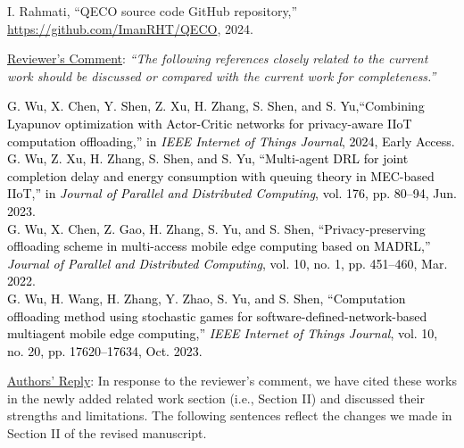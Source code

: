 \documentclass[12pt,draftclsnofoot,onecolumn]{IEEEtran}
\newcommand{\rev}[1]{{\color{blue}#1}} %
\newcommand{\rev}[1]{#1}
\newenvironment{my}[2]%
{\begin{list}{}%
{\setlength{\rightmargin}{#1}\setlength{\leftmargin}{#2}}%


 \item[]{}

} {\end{list}}
\begin{document}
\begin{enumerate}
		\begin{my}{1cm}{1cm}
	\rev{
		{\small
			\noindent\hspace{-0.5mm}\cite{QECO} I. Rahmati, ``QECO source code GitHub repository,'' \url{https://github.com/ImanRHT/QECO}, 2024.\\[6pt]}}
\end{my}



	\item \underline{Reviewer's Comment}: 
	\textit{``The following references closely related to the current work should be discussed or compared with the current work for completeness.''} \newline
		\begin{my}{1cm}{1cm}
		\rev{ 
			{\small
				\noindent\hspace{-1.8mm}
				\cite{wu2024combining}  \textcolor{black}{G. Wu, X. Chen, Y. Shen, Z. Xu, H. Zhang, S. Shen, and S. Yu,``Combining Lyapunov optimization with Actor-Critic networks for privacy-aware IIoT computation offloading,'' in \textit{IEEE Internet of Things Journal}, 2024, Early Access.}\\[6pt]
				\cite{wu2023multi} \textcolor{black}{G. Wu, Z. Xu, H. Zhang, S. Shen, and S. Yu,  ``Multi-agent DRL for joint completion delay and energy consumption with queuing theory in MEC-based IIoT,'' in \textit{Journal of Parallel and Distributed Computing}, vol. 176, pp. 80–94, Jun. 2023.}\\[6pt]
				\cite{wu2024privacy} \textcolor{black}{G. Wu, X. Chen, Z. Gao, H. Zhang, S. Yu, and S. Shen, ``Privacy-preserving offloading scheme in multi-access mobile edge computing based on MADRL,'' \textit{Journal of Parallel and Distributed Computing}, vol. 10, no. 1, pp. 451--460, Mar. 2022.}\\[6pt]
				 \cite{wu2023computation} \textcolor{black}{G. Wu, H. Wang, H. Zhang, Y. Zhao, S. Yu, and S. Shen, ``Computation offloading method using stochastic games for software-defined-network-based multiagent mobile edge computing,'' \textit{IEEE Internet of Things Journal}, vol. 10, no. 20, pp. 17620–17634, Oct. 2023.}\\[6pt]}}
	\end{my}

	\underline{Authors' Reply}: In response to the reviewer's comment, we have cited these works in the newly added related work section (i.e., Section II) and discussed their strengths and limitations. The following sentences reflect the changes we made in Section II of the revised manuscript. \vspace{3mm}
	

\end{enumerate}
\end{document}

